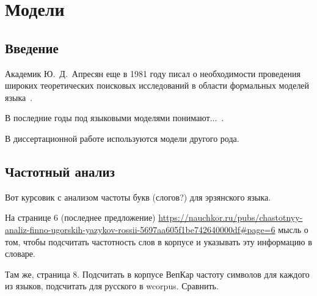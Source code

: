 \chapter{Модели} \label{chapt_models}

\section{Введение} \label{sect_model_intro}
Академик Ю.~Д.~Апресян еще в 1981 году писал о необходимости проведения широких теоретических поисковых исследований в области формальных моделей языка~\cite{Apresjan1981}.

В последние годы под языковыми моделями понимают...~\cite{Petroni2019}. 

В диссертационной работе используются модели другого рода.

\section{Частотный анализ} \label{sect_ideas_1}


Вот курсовик с анализом частоты букв (слогов?) для эрзянского языка.

На странице 6 (последнее предложение)
\url{https://nauchkor.ru/pubs/chastotnyy-analiz-finno-ugorskih-yazykov-rossii-5697aa605f1be742640000df#page=6}
мысль о том, чтобы подсчитать частотность слов в корпусе и указывать эту информацию в словаре.

Там же, страница 8. Подсчитать в корпусе ВепКар частоту символов для каждого из языков, 
подсчитать для русского в wcorpus. Сравнить.


